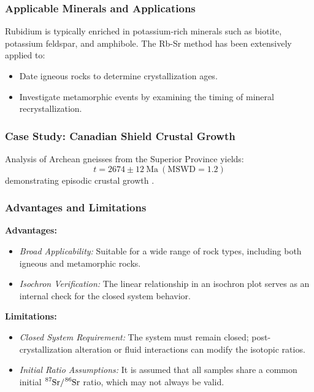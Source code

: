 \documentclass{article}
\begin{document}
\subsubsection*{Applicable Minerals and Applications}
Rubidium is typically enriched in potassium-rich minerals such as biotite, potassium feldspar, and amphibole. The Rb-Sr method has been extensively applied to:
\begin{itemize}
    \item Date igneous rocks to determine crystallization ages.
    \item Investigate metamorphic events by examining the timing of mineral recrystallization.
\end{itemize}

\subsubsection*{Case Study: Canadian Shield Crustal Growth}
Analysis of Archean gneisses from the Superior Province yields:
\begin{equation}
    t = 2674 \pm 12\ \text{Ma}\ (\text{MSWD} = 1.2)
    \label{eq:canadian_age}
\end{equation}
demonstrating episodic crustal growth \cite{Dickin2005}.

\subsubsection*{Advantages and Limitations}
\textbf{Advantages:}
\begin{itemize}
    \item \emph{Broad Applicability:} Suitable for a wide range of rock types, including both igneous and metamorphic rocks.
    \item \emph{Isochron Verification:} The linear relationship in an isochron plot serves as an internal check for the closed system behavior.
\end{itemize}

\textbf{Limitations:}
\begin{itemize}
    \item \emph{Closed System Requirement:} The system must remain closed; post-crystallization alteration or fluid interactions can modify the isotopic ratios.
    \item \emph{Initial Ratio Assumptions:} It is assumed that all samples share a common initial \(\ce{^{87}Sr}/\ce{^{86}Sr}\) ratio, which may not always be valid.
\end{itemize}
\end{document}
